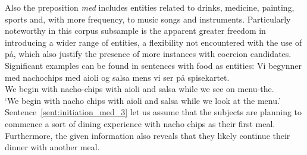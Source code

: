 \documentclass{article}
\begin{document}
Also the preposition \emph{med} includes entities related to drinks, medicine, painting, sports and, with more frequency, to music songs and instruments. Particularly noteworthy in this corpus subsample is the apparent greater freedom in introducing a wider range of entities, a flexibility not encountered with the use of på, which also justify the presence of more instances with coercion candidates. Significant examples can be found in sentences with food as entities: 
        \ea \label{sent:initiation_med_3} %
        \gll Vi begynner med nachochips med aioli og salsa mens vi ser på spisekartet.\\
        We begin with nacho-chips with aioli and salsa while we see on menu-the.\\
        \glt ‘We begin with nacho chips with aioli and salsa while we look at the menu.’
        \z
Sentence~\ref{sent:initiation_med_3} let us assume that the subjects are planning to commence a sort of dining experience with nacho chips as their first meal. Furthermore, the given information also reveals that they likely continue their dinner with another meal.      
\end{document}
